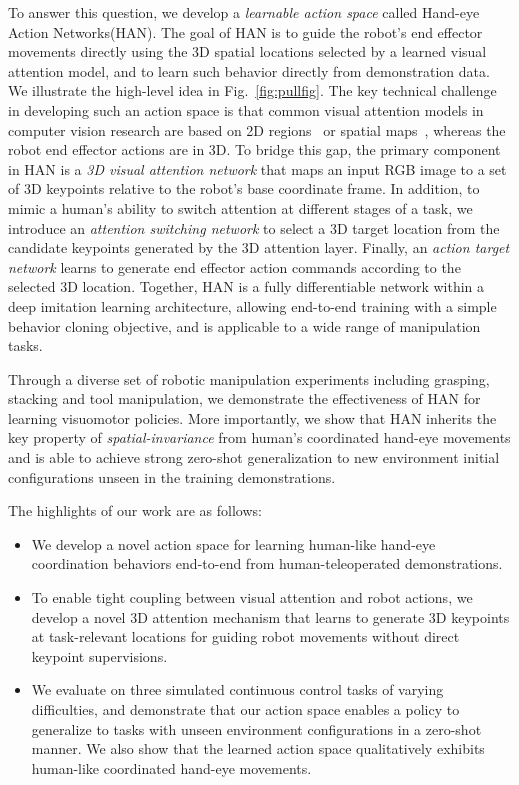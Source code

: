 \documentclass[letterpaper, 10 pt, conference]{ieeeconf}
\newcommand{\algoName}{HAN\xspace}
\newcommand{\algoNameFull}{Hand-eye Action Networks\xspace}
\begin{document}
To answer this question, we develop a \emph{learnable action space} called \algoNameFull (\algoName).
The goal of \algoName is to guide the robot's end effector movements directly using the 3D spatial locations selected by a learned visual attention model, and to learn such behavior directly from demonstration data. We illustrate the high-level idea in Fig.~\ref{fig:pullfig}. The key technical challenge in developing such an action space is that common visual attention models in computer vision research are based on 2D regions~\cite{mnih2014recurrent} or spatial maps~\cite{xu2015show}, whereas the robot end effector actions are in 3D. To bridge this gap, the primary component in \algoName is a \emph{3D visual attention network} that maps an input RGB image to a set of 3D keypoints relative to the robot's base coordinate frame. In addition, to mimic a human's ability to switch attention at different stages of a task, we introduce an \emph{attention switching network} to select a 3D target location from the candidate keypoints generated by the 3D attention layer. Finally, an \emph{action target network} learns to generate end effector action commands according to the selected 3D location.
Together, \algoName is a fully differentiable network within a deep imitation learning architecture, allowing end-to-end training with a simple behavior cloning objective, and is applicable to a wide range of manipulation tasks. 

Through a diverse set of robotic manipulation experiments including grasping, stacking and tool manipulation, we demonstrate the effectiveness of \algoName for learning visuomotor policies. More importantly, we show that \algoName inherits the key property of \emph{spatial-invariance} from human's coordinated hand-eye movements and is able to achieve strong zero-shot generalization to new environment initial configurations unseen in the training demonstrations.

The highlights of our work are as follows:
\begin{itemize}
    \item We develop a novel action space for learning human-like hand-eye coordination behaviors end-to-end from human-teleoperated demonstrations.
    \item To enable tight coupling between visual attention and robot actions, we develop a novel 3D attention mechanism that learns to generate 3D keypoints at task-relevant locations for guiding robot movements without direct keypoint supervisions.
    \item We evaluate on three simulated continuous control tasks of varying difficulties, and demonstrate that our action space enables a policy to generalize to tasks with unseen environment configurations in a zero-shot manner. We also show that the learned action space qualitatively exhibits human-like coordinated hand-eye movements.
\end{itemize}
\end{document}

